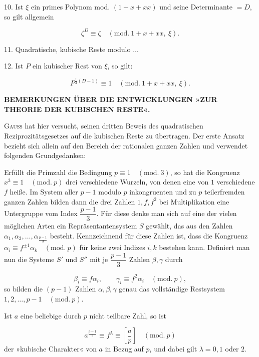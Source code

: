 10. Ist $\xi$ ein primes Polynom mod. $(1+x+xx)$ und seine Determinante $=D$,
so gilt allgemein

\[
\zeta^D \equiv \zeta \quad(\mathrm{mod.}\ 1+x+xx,\ \xi).
\]

11. Quadratische, kubische Reste modulo $\ldots$

12. Ist $P$ ein kubischer Rest von $\xi$, so gilt:

\[
P^{\frac{1}{3}(D-1)} \equiv 1 \quad(\mathrm{mod.}\ 1+x+xx,\ \xi).
\]



\begingroup\small
\begin{center}
\textbf{BEMERKUNGEN ÜBER DIE ENTWICKLUNGEN »ZUR THEORIE DER KUBISCHEN} 
\textbf{RESTE«.}
\end{center}
\noindent\hspace*{\parindent}\textsc{Gauss} hat hier versucht, seinen dritten Beweis des
quadratischen Reziprozitätsgesetzes auf die kubischen Reste zu übertragen.
Der erste Ansatz bezieht sich allein auf den Bereich der rationalen ganzen
Zahlen und verwendet folgenden Grundgedanken:

Erfüllt die Primzahl die Bedingung $p \equiv 1 \quad(\mathrm{mod.}\ 3)$, so hat die Kongruenz $x^3 \equiv 1
\quad(\mathrm{mod.}\ p)$
drei verschiedene Wurzeln, von denen eine von $1$ verschiedene $f$ heiße.
Im System aller $p-1$ modulo $p$ inkongruenten und zu
$p$ teilerfremden ganzen Zahlen bilden dann die drei Zahlen $1, f, f^2$
bei Multiplikation eine Untergruppe vom Index $\dfrac{p-1}{3}$. Für diese denke man
sich auf eine der vielen möglichen Arten ein Repräsentantensystem $S$
gewählt, das aus den Zahlen $\alpha_1, \alpha_2,
\ldots, \alpha_{\frac{p-1}{3}}$ besteht. Kennzeichnend für diese Zahlen
ist, dass die Kongruenz $\alpha_i \equiv f^{\pm1}\alpha_k
\quad(\mathrm{mod.}\ p)$ für keine zwei Indizes $i, k$ bestehen kann.
Definiert man nun die Systeme $S'$ und $S''$ mit je $\dfrac{p-1}{3}$ Zahlen
$\beta, \gamma$ durch

\[
\beta_i \equiv f\alpha_i, \qquad \gamma_i \equiv f^2\alpha_i \quad(\mathrm{mod.}\ p),
\]
\noindent so bilden die $(p-1)$ Zahlen $\alpha, \beta, \gamma$ genau das vollständige
Restsystem\hfill\\
$1, 2, \ldots, {p-1} \quad(\mathrm{mod.}\ p)$.

Ist $a$ eine beliebige durch $p$ nicht teilbare Zahl, so ist

\[
a^{\frac{p-1}{3}} \equiv f^{\lambda} \equiv \left[\frac{a}{p}\right] \quad(\mathrm{mod.}\ p)
\]
\noindent der »kubische Charakter« von $a$ in Bezug auf $p$, und dabei gilt
$\lambda = 0, 1$ oder $2$.

